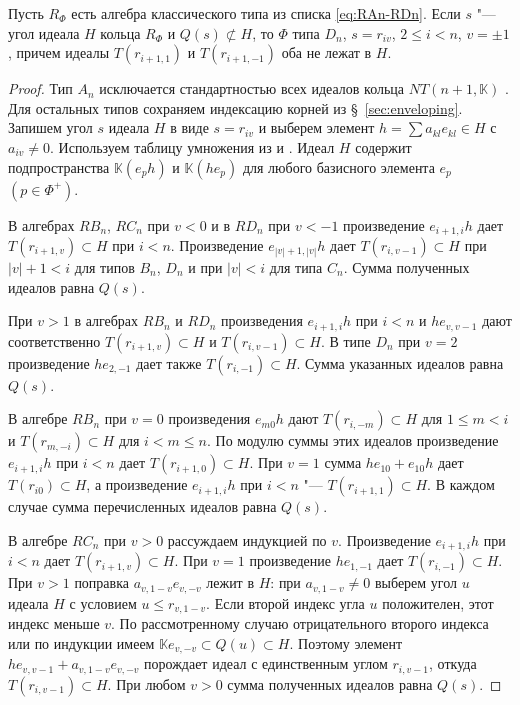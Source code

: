 \documentclass[a4paper,14pt,oneside,openany]{memoir}
\begin{document}
\begin{theorem}\label{th:classical-Exc-RDn}
    Пусть $R_{\Phi}$ есть алгебра классического типа из списка \eqref{eq:RAn-RDn}.
    Если $s$ "--- угол идеала $H$ кольца $R_{\Phi}$ и $Q(s) \not\subset H$, то
    $\Phi$ типа $D_n$, $s=r_{iv}$, $2 \leq i<n$, $v=\pm 1$, причем идеалы
    $T(r_{i+1,1})$ и $T(r_{i+1,-1})$ оба не лежат в $H$.
\end{theorem}

\begin{proof}
    Тип $A_n$ исключается стандартностью всех идеалов кольца $NT(n+1,\mathbb{K})$
    \cite[следствие~4.2]{vL74}. Для остальных типов сохраняем индексацию корней из
    \S~\ref{sec:enveloping}. Запишем угол $s$ идеала $H$ в виде $s=r_{iv}$ и
    выберем элемент $h=\sum a_{kl}e_{kl}\in H$ с $a_{iv}\neq0$. Используем таблицу
    умножения из  и . Идеал $H$
    содержит подпространства $\mathbb{K}(e_ph)$ и $\mathbb{K}(he_p)$ для любого
    базисного элемента $e_p$ $(p\in\Phi^+)$.

    В алгебрах $RB_n$, $RC_n$ при $v<0$ и в $RD_n$ при $v<-1$ произведение
    $e_{i+1,i}h$ дает $T(r_{i+1,v})\subset H$ при $i<n$. Произведение
    $e_{|v|+1,|v|}h$ дает $T(r_{i,v-1})\subset H$ при $|v|+1<i$ для типов $B_n$,
    $D_n$ и при $|v|<i$ для типа $C_n$. Сумма полученных идеалов равна $Q(s)$.

    При $v>1$ в алгебрах $RB_n$ и $RD_n$ произведения $e_{i+1,i}h$ при $i<n$ и
    $he_{v,v-1}$ дают соответственно $T(r_{i+1,v})\subset H$ и $T(r_{i,v-1})\subset
    H$. В типе $D_n$ при $v=2$ произведение $he_{2,-1}$ дает также
    $T(r_{i,-1})\subset H$. Сумма указанных идеалов равна $Q(s)$.

    В алгебре $RB_n$ при $v=0$ произведения $e_{m0}h$ дают $T(r_{i,-m})\subset H$
    для $1\leq m<i$ и $T(r_{m,-i})\subset H$ для $i<m\leq n$. По модулю суммы этих
    идеалов произведение $e_{i+1,i}h$ при $i<n$ дает $T(r_{i+1,0})\subset H$. При
    $v=1$ сумма $he_{10}+e_{10}h$ дает $T(r_{i0})\subset H$, а произведение
    $e_{i+1,i}h$ при $i<n$ "--- $T(r_{i+1,1})\subset H$. В каждом случае сумма
    перечисленных идеалов равна $Q(s)$.

    В алгебре $RC_n$ при $v>0$ рассуждаем индукцией по $v$. Произведение
    $e_{i+1,i}h$ при $i<n$ дает $T(r_{i+1,v})\subset H$. При $v=1$ произведение
    $he_{1,-1}$ дает $T(r_{i,-1})\subset H$. При $v>1$ поправка $a_{v,1-v}e_{v,-v}$
    лежит в $H$: при $a_{v,1-v}\neq0$ выберем угол $u$ идеала $H$ с условием $u\leq
    r_{v,1-v}$. Если второй индекс угла $u$ положителен, этот индекс меньше $v$. По
    рассмотренному случаю отрицательного второго индекса или по индукции имеем
    $\mathbb{K}e_{v,-v}\subset Q(u)\subset H$. Поэтому элемент
    $he_{v,v-1}+a_{v,1-v}e_{v,-v}$ порождает идеал с единственным углом
    $r_{i,v-1}$, откуда $T(r_{i,v-1})\subset H$. При любом $v>0$ сумма полученных
    идеалов равна $Q(s)$.


\end{proof}
\end{document}
